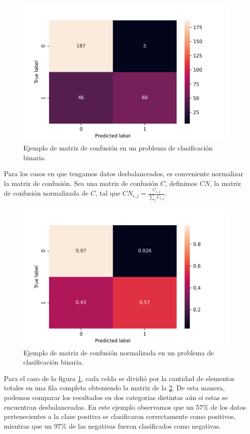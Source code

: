 \begin{figure}[h!]
    \centering
    \includegraphics[width=0.7\linewidth]{figures/cm_example_raw.png}
    \caption{Ejemplo de matriz de confusión en un problema de clasificación binaria.}
    \label{fig:cm_example_raw}
\end{figure}

Para los casos en que tengamos datos desbalanceados, es conveniente normalizar
la matriz de confusión. Sea una matriz de confusión $C$, definimos $CN$, la
matriz de confusión normalizada de $C$, tal que $CN_{i,j} =
\frac{C_{i,j}}{\sum_{j} C_{i, j}}$.

\begin{figure}[h!]
    \centering
    \includegraphics[width=0.7\linewidth]{figures/cm_example_percent.png}
    \caption{Ejemplo de matriz de confusión normalizada en un problema de clasificación binaria.}
    \label{fig:cm_example_percent}
\end{figure}

Para el caso de la figura \ref{fig:cm_example_raw}, cada celda se dividió por la
cantidad de elementos totales en una fila completa obteniendo la matriz de la
\ref{fig:cm_example_percent}. De esta manera, podemos comparar los resultados en
dos categorias distintas aún si estas se encuentran desbalanceadas. En este
ejemplo observamos que un 57\% de los datos pertenecientes a la clase positiva
se clasificaron correctamente como positivos, mientras que un 97\% de las
negativas fueron clasificados como negativas.

